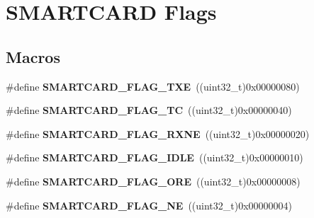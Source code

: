 \hypertarget{group___smart_card___flags}{}\section{S\+M\+A\+R\+T\+C\+A\+RD Flags}
\label{group___smart_card___flags}
\subsection*{Macros}
\begin{DoxyCompactItemize}
\item 
\#define {\bfseries S\+M\+A\+R\+T\+C\+A\+R\+D\+\_\+\+F\+L\+A\+G\+\_\+\+T\+XE}~((uint32\+\_\+t)0x00000080)\hypertarget{group___smart_card___flags_ga5ac591d03dcadd10c53f6d586a0e485c}{}\label{group___smart_card___flags_ga5ac591d03dcadd10c53f6d586a0e485c}

\item 
\#define {\bfseries S\+M\+A\+R\+T\+C\+A\+R\+D\+\_\+\+F\+L\+A\+G\+\_\+\+TC}~((uint32\+\_\+t)0x00000040)\hypertarget{group___smart_card___flags_ga778899c7c536fcbbcf3d6cc00b4139fb}{}\label{group___smart_card___flags_ga778899c7c536fcbbcf3d6cc00b4139fb}

\item 
\#define {\bfseries S\+M\+A\+R\+T\+C\+A\+R\+D\+\_\+\+F\+L\+A\+G\+\_\+\+R\+X\+NE}~((uint32\+\_\+t)0x00000020)\hypertarget{group___smart_card___flags_ga1f617725b179572983789cbc7da1a955}{}\label{group___smart_card___flags_ga1f617725b179572983789cbc7da1a955}

\item 
\#define {\bfseries S\+M\+A\+R\+T\+C\+A\+R\+D\+\_\+\+F\+L\+A\+G\+\_\+\+I\+D\+LE}~((uint32\+\_\+t)0x00000010)\hypertarget{group___smart_card___flags_ga5576e74148257291b05dcc410f501e8a}{}\label{group___smart_card___flags_ga5576e74148257291b05dcc410f501e8a}

\item 
\#define {\bfseries S\+M\+A\+R\+T\+C\+A\+R\+D\+\_\+\+F\+L\+A\+G\+\_\+\+O\+RE}~((uint32\+\_\+t)0x00000008)\hypertarget{group___smart_card___flags_ga48dfe32b52249f43c0e4396a29c07a85}{}\label{group___smart_card___flags_ga48dfe32b52249f43c0e4396a29c07a85}

\item 
\#define {\bfseries S\+M\+A\+R\+T\+C\+A\+R\+D\+\_\+\+F\+L\+A\+G\+\_\+\+NE}~((uint32\+\_\+t)0x00000004)\hypertarget{group___smart_card___flags_ga14a7b77b47b2e83a4cf4ef6f8e8ee23b}{}\label{group___smart_card___flags_ga14a7b77b47b2e83a4cf4ef6f8e8ee23b}


\end{DoxyCompactItemize}
